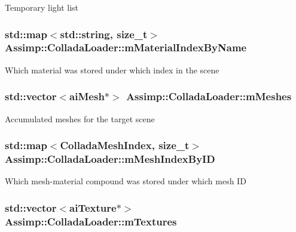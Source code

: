 Temporary light list \hypertarget{class_assimp_1_1_collada_loader_a1086d5de6cf2cf2e9d0db608db10f52c}{
\subsubsection[{m\+Material\+Index\+By\+Name}]{\setlength{\rightskip}{0pt plus 5cm}std\+::map$<$std\+::string, size\+\_\+t$>$ Assimp\+::\+Collada\+Loader\+::m\+Material\+Index\+By\+Name\hspace{0.3cm}{\ttfamily [protected]}}}\label{class_assimp_1_1_collada_loader_a1086d5de6cf2cf2e9d0db608db10f52c}
Which material was stored under which index in the scene \hypertarget{class_assimp_1_1_collada_loader_a6bb252f1dd881fda84f7575877836068}{
\subsubsection[{m\+Meshes}]{\setlength{\rightskip}{0pt plus 5cm}std\+::vector$<${\bf ai\+Mesh}$\ast$$>$ Assimp\+::\+Collada\+Loader\+::m\+Meshes\hspace{0.3cm}{\ttfamily [protected]}}}\label{class_assimp_1_1_collada_loader_a6bb252f1dd881fda84f7575877836068}
Accumulated meshes for the target scene \hypertarget{class_assimp_1_1_collada_loader_a68daccdd41b732f9c6a8f59a55e3e3d4}{
\subsubsection[{m\+Mesh\+Index\+By\+I\+D}]{\setlength{\rightskip}{0pt plus 5cm}std\+::map$<${\bf Collada\+Mesh\+Index}, size\+\_\+t$>$ Assimp\+::\+Collada\+Loader\+::m\+Mesh\+Index\+By\+I\+D\hspace{0.3cm}{\ttfamily [protected]}}}\label{class_assimp_1_1_collada_loader_a68daccdd41b732f9c6a8f59a55e3e3d4}
Which mesh-\/material compound was stored under which mesh I\+D \hypertarget{class_assimp_1_1_collada_loader_aa9bd38aa446946f5160e4714615e8bab}{
\subsubsection[{m\+Textures}]{\setlength{\rightskip}{0pt plus 5cm}std\+::vector$<${\bf ai\+Texture}$\ast$$>$ Assimp\+::\+Collada\+Loader\+::m\+Textures\hspace{0.3cm}{\ttfamily [protected]}}}\label{class_assimp_1_1_collada_loader_aa9bd38aa446946f5160e4714615e8bab}
